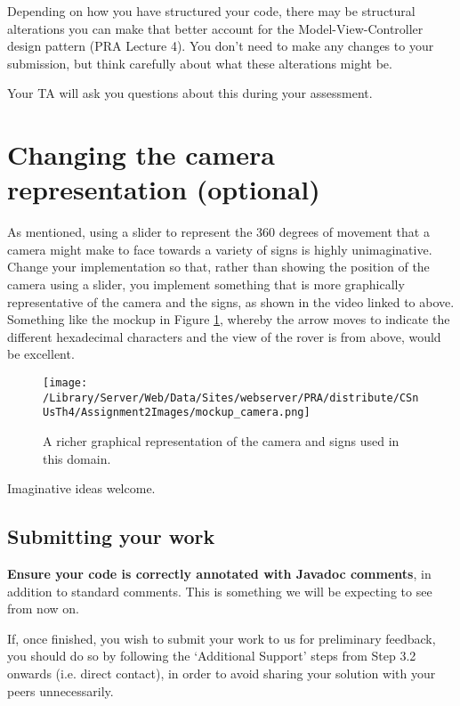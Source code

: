 \documentclass[11pt]{article}
\begin{document}
Depending on how you have structured your code, there may be structural alterations you can make that better account for the Model-View-Controller design pattern (PRA Lecture 4). You don't need to make any changes to your submission, but think carefully about what these alterations might be. 

Your TA will ask you questions about this during your assessment.

\section{Changing the camera representation (optional)}

As mentioned, using a slider to represent the 360 degrees of movement that a camera might make to face towards a variety of signs is highly unimaginative. Change your implementation so that, rather than showing the position of the camera using a slider, you implement something that is more graphically representative of the camera and the signs, as shown in the video linked to above. Something like the mockup in Figure \ref{fig:mockup-camera}, whereby the arrow moves to indicate the different hexadecimal characters and the view of the rover is from above, would be excellent.

\begin{figure}[htbp]
\begin{center}
\texttt{[image: /Library/Server/Web/Data/Sites/webserver/PRA/distribute/CSnUsTh4/Assignment2Images/mockup\_camera.png]}
\caption{A richer graphical representation of the camera and signs used in this domain.}
\label{fig:mockup-camera}
\end{center}
\end{figure}

Imaginative ideas welcome.

\subsection{Submitting your work}

\textbf{Ensure your code is correctly annotated with Javadoc comments}, in addition to standard comments. This is something we will be expecting to see from now on.

If, once finished, you wish to submit your work to us for preliminary feedback, you should do so by following the `Additional Support' steps from Step 3.2 onwards (i.e. direct contact), in order to avoid sharing your solution with your peers unnecessarily.
\end{document}
